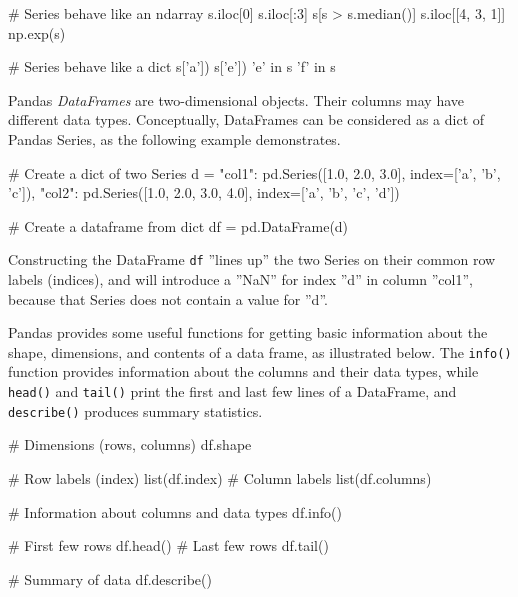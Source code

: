 \begin{samepage}
\begin{pythoncode}
# Series behave like an ndarray
s.iloc[0]
s.iloc[:3]
s[s > s.median()]
s.iloc[[4, 3, 1]]
np.exp(s)

# Series behave like a dict
s['a'])
s['e'])
'e' in s
'f' in s
\end{pythoncode}
\end{samepage}

Pandas \emph{DataFrames} are two-dimensional objects. Their columns may have different data types. Conceptually, DataFrames can be considered as a dict of Pandas Series, as the following example demonstrates. 

\begin{samepage}
\begin{pythoncode}
# Create a dict of two Series
d = {
    "col1": pd.Series([1.0, 2.0, 3.0], 
                index=['a', 'b', 'c']),
    "col2": pd.Series([1.0, 2.0, 3.0, 4.0], 
                index=['a', 'b', 'c', 'd'])
}

# Create a dataframe from dict
df = pd.DataFrame(d)
\end{pythoncode}
\end{samepage}

Constructing the DataFrame \texttt{df} ''lines up'' the two Series on their common row labels (indices), and will introduce a ''NaN'' for index ''d'' in column ''col1'', because that Series does not contain a value for ''d''.

Pandas provides some useful functions for getting basic information about the shape, dimensions, and contents of a data frame, as illustrated below. The \texttt{info()} function provides information about the columns and their data types, while \texttt{head()} and \texttt{tail()} print the first and last few lines of a DataFrame, and \texttt{describe()} produces summary statistics.

\begin{samepage}
\begin{pythoncode}
# Dimensions (rows, columns)
df.shape

# Row labels (index)
list(df.index)
# Column labels
list(df.columns)

# Information about columns and data types
df.info()

# First few rows
df.head()
# Last few rows
df.tail()

# Summary of data
df.describe()
\end{pythoncode}
\end{samepage}


